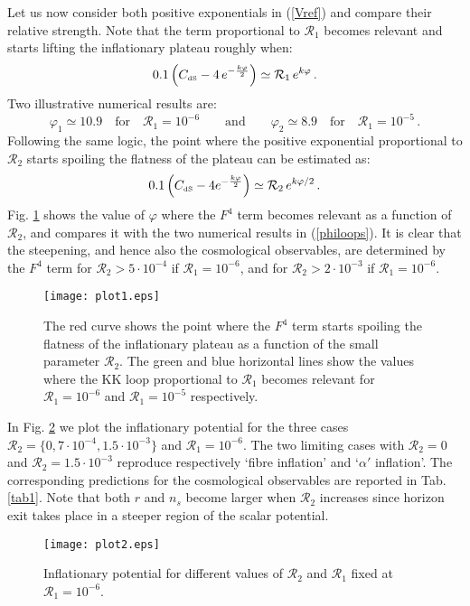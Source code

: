 \documentclass[11pt,a4paper]{article}
\newcommand{\be}{\begin{equation}}
\newcommand{\ee}{\end{equation}}
\def\dS{{\scriptscriptstyle \rm dS}}
\newcommand{\mc}{\mathcal}
\begin{document}
Let us now consider both positive exponentials in (\ref{Vref}) and compare their relative strength. Note that the term proportional to $\mc{R}_1$ becomes relevant and starts lifting the inflationary plateau roughly when:
\be
0.1 \left(C_\dS - 4 \,e^{-\frac{k \varphi}{2}}\right) \simeq \mc{R}_1\, e^{k \varphi}\,.
\label{loopssteepening}
\ee
Two illustrative numerical results are:
\be
\varphi_1 \simeq 10.9 \quad \text{for} \quad \mc{R}_1 = 10^{-6} \qquad\text{and}\qquad \varphi_2 \simeq 8.9 \quad \text{for} \quad \mc{R}_1 = 10^{-5} \,.
\label{philoops}
\ee
Following the same logic, the point where the positive exponential proportional to $\mc{R}_2$ starts spoiling the flatness of the plateau can be estimated as:
\be
0.1 \left(C_\dS - 4 e^{-\frac{k \varphi}{2}}\right) \simeq \mc{R}_2\, e^{k \varphi/2}\,.
\label{F4steepening}
\ee
Fig. \ref{fig1} shows the value of $\varphi$ where the $F^4$ term becomes relevant as a function of $\mc{R}_2$, and compares it with the two numerical results in (\ref{philoops}). It is clear that the steepening, and hence also the cosmological observables, are determined by the $F^4$ term for $\mc{R}_2 > 5 \cdot 10^{-4}$ if $\mc{R}_1 = 10^{-6}$, and for $\mc{R}_2 > 2 \cdot 10^{-3}$ if $\mc{R}_1 = 10^{-6}$. 

\begin{figure}[h!]
\begin{center}
\texttt{[image: plot1.eps]}
\caption{The red curve shows the point where the $F^4$ term starts spoiling the flatness of the inflationary plateau as a function of the small parameter $\mc{R}_2$. The green and blue horizontal lines show the values where the KK loop proportional to $\mc{R}_1$ becomes relevant for $\mc{R}_1=10^{-6}$ and $\mc{R}_1=10^{-5}$ respectively.} \label{fig1}
\end{center}
\end{figure}

In Fig. \ref{fig2} we plot the inflationary potential for the three cases $\mc{R}_2 = \{0, 7 \cdot 10^{-4}, 1.5 \cdot 10^{-3}\}$ and $\mc{R}_1 = 10^{-6}$. The two limiting cases with $\mc{R}_2 = 0$ and $\mc{R}_2=1.5\cdot 10^{-3}$ reproduce respectively `fibre inflation' and `$\alpha'$ inflation'. The corresponding predictions for the cosmological observables are reported in Tab. \ref{tab1}. Note that both $r$ and $n_s$ become larger when $\mc{R}_2$ increases since horizon exit takes place in a steeper region of the scalar potential.

\begin{figure}[h!]
\begin{center}
\texttt{[image: plot2.eps]}
\caption{Inflationary potential for different values of $\mc{R}_2$ and $\mc{R}_1$ fixed at $\mc{R}_1=10^{-6}$.} \label{fig2}
\end{center}
\end{figure}
\end{document}
